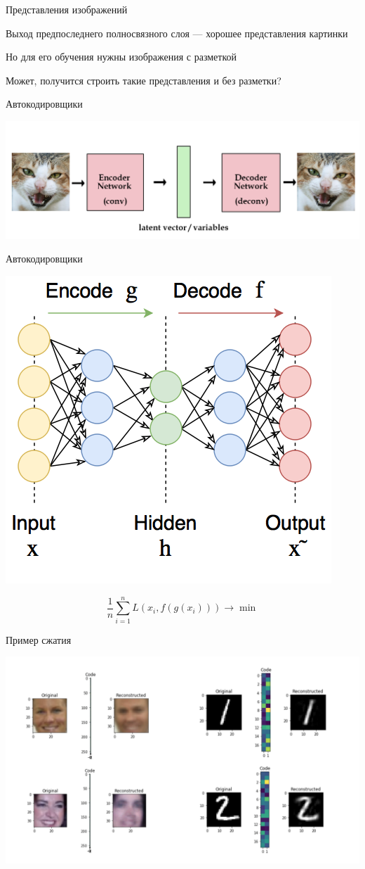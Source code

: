 \documentclass[notes,12pt, aspectratio=169]{beamer}
\newenvironment{wideitemize}{\itemize\addtolength{\itemsep}{10pt}}{\enditemize}
\begin{document}
\begin{frame}{Представления изображений}
\begin{wideitemize}
	\item Выход предпоследнего полносвязного слоя — хорошее
	представления картинки
	\item Но для его обучения нужны изображения с разметкой
	\item Может, получится строить такие представления и без разметки?	
\end{wideitemize}
\end{frame}


\begin{frame}{Автокодировщики}
	\begin{center}
		\includegraphics[width=.9\linewidth]{autoencoder.png}
	\end{center}
\end{frame}


\begin{frame}{Автокодировщики}
\begin{center}
	\includegraphics[width=.42\linewidth]{auto.png}
\end{center} \pause
\[
\frac{1}{n} \sum_{i=1}^n L(x_i, f(g(x_i))) \to \min 
\]
\end{frame}


\begin{frame}{Пример сжатия}
	\begin{center}
		\includegraphics[width=.8\linewidth]{ato_enc.png}
	\end{center}
\end{frame}
\end{document}

